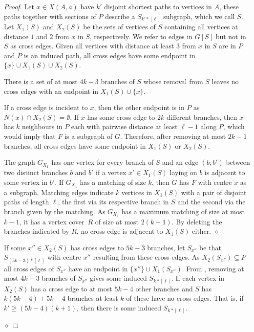 \documentclass[runningheads,envcountsame]{llncs}
\newcommand{\forbiddenGraph}{F}
\newenvironment{claimproof}
{\noindent {\em Proof of Claim:} }
{\hfill $\diamond$ \smallskip}
\begin{document}
\begin{proof}
\begin{claimproof}
    Let $x \in X(A,a)$ have $k'$ disjoint shortest paths to vertices in $A$, 
    these paths together with sections of $P$
    describe a $S_{k'*[\ell]}$ subgraph, which we call $S$. Let
    $X_1(S)$ and $X_2(S)$ be the sets of vertices of $S$ containing all
    vertices at distance $1$ and $2$
    from $x$ in $S$, respectively. We refer to edges in $G[S]$ but not in $S$ as
    cross edges. Given all vertices with distance at least $3$ from
    $x$ in $S$ are in $P$ and $P$ is an induced path, all cross edges have some endpoint in
    $\{x\} \cup X_1(S)\cup X_2(S)$.
    \begin{mclaim}\label{clm:x'branches}
      There is a set of at most $4k-3$ branches of $S$ whose removal
      from $S$ leaves no cross edges with an endpoint in $X_1(S) \cup
      \{x\}$.
    \end{mclaim}
    \begin{claimproof}
      If a cross edge is incident to $x$, then the other endpoint is
      in $P$ as $N(x) \cap X_2(S) = \emptyset$. If $x$ has some cross
      edge to $2k$ different branches, then $x$ has $k$ neighbours in
      $P$ each with pairwise distance at least $\ell-1$ along $P$,
      which would imply that $\forbiddenGraph$ is a subgraph of $G$.
      Therefore, after removing at
      most $2k-1$ branches, all cross edges have some endpoint in
      $X_1(S)$ or $X_2(S)$.
          
      The graph $G_{X_1}$ has one vertex for every
      branch of $S$ and an edge $(b,b')$ between two distinct
      branches $b$ and $b'$ if a vertex $x' \in
      X_1(S)$ laying on $b$ is adjacent to some vertex in $b'$. If
      $G_{X_1}$  has a matching of size  $k$, then $G$ has
      $\forbiddenGraph$ with centre $x$ as a subgraph. Matching edges indicate $k$
      vertices in $X_1(S)$ with a pair of disjoint paths of length $\ell$,
      the first via its respective branch in $S$ and the second via
      the branch given by the matching. As  $G_{X_1}$ has a maximum
      matching of size at most $k-1$, it has a vertex cover~$R$ of
      size at most $2(k-1)$. By deleting the branches
      indicated by $R$, no cross edge is adjacent to $X_1(S)$ either. 
    \end{claimproof}

\noindent
    If some $x'' \in X_2(S)$ has cross edges to $5k-3$ branches, let
    $S_{x''}$ be that $S_{(5k-3)*[\ell]}$ with centre $x''$ resulting from
    these cross edges. As $X_2(S_{x''}) \subseteq P$ all
    cross edges of $S_{x''}$ have an endpoint in $\{x''\} \cup X_1(S_{x''})$. From ,
    removing at most $4k-3$ branches of $S_{x''}$ gives some induced $S_{k*[\ell]}$.
    If each vertex in $X_2(S)$ has a cross edge to at most $5k-4$ other branches
    and $S$ has $k(5k-4)+5k-4$ branches at least $k$ of these have no
    cross edges. That is, if $k' \geq (5k-4)(k+1)$, then there is some induced
    $S_{k*[\ell]}$.
    

\end{claimproof}
\end{proof}
\end{document}
